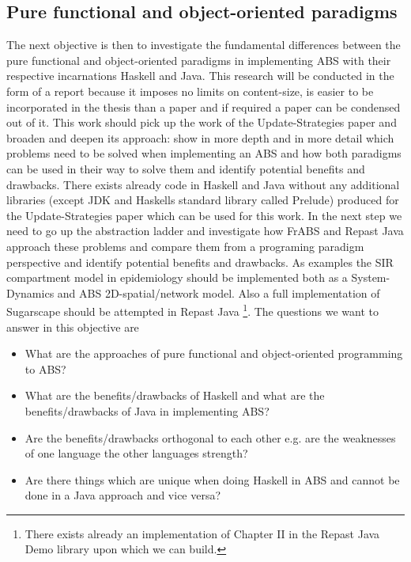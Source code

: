\subsection{Pure functional and object-oriented paradigms}
The next objective is then to investigate the fundamental differences between the pure functional and object-oriented paradigms in implementing ABS with their respective incarnations Haskell and Java. This research will be conducted in the form of a report because it imposes no limits on content-size, is easier to be incorporated in the thesis than a paper and if required a paper can be condensed out of it.
This work should pick up the work of the Update-Strategies paper and broaden and deepen its approach: show in more depth and in more detail which problems need to be solved when implementing an ABS and how both paradigms can be used in their way to solve them and identify potential benefits and drawbacks. There exists already code in Haskell and Java without any additional libraries (except JDK and Haskells standard library called Prelude) produced for the Update-Strategies paper which can be used for this work.
In the next step we need to go up the abstraction ladder and investigate how FrABS and Repast Java approach these problems and compare them from a programing paradigm perspective and identify potential benefits and drawbacks.
As examples the SIR compartment model in epidemiology should be implemented both as a System-Dynamics and ABS 2D-spatial/network model. Also a full implementation of Sugarscape should be attempted in Repast Java \footnote{There exists already an implementation of Chapter II in the Repast Java Demo library upon which we can build.}.
The questions we want to answer in this objective are
\begin{itemize}
	\item What are the approaches of pure functional and object-oriented programming to ABS?
	\item What are the benefits/drawbacks of Haskell and what are the benefits/drawbacks of Java in implementing ABS?
	\item Are the benefits/drawbacks orthogonal to each other e.g. are the weaknesses of one language the other languages strength?
	\item Are there things which are unique when doing Haskell in ABS and cannot be done in a Java approach and vice versa?
\end{itemize}

